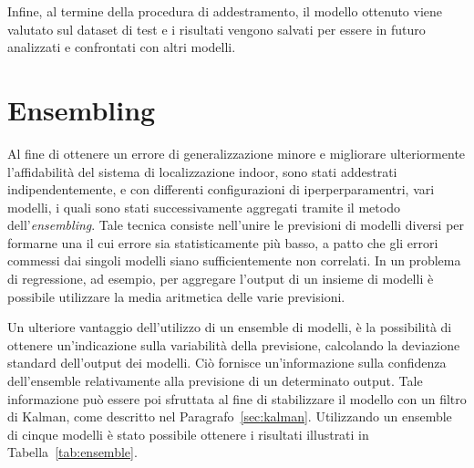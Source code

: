 Infine, al termine della procedura di addestramento, il modello ottenuto viene
valutato sul dataset di test e i risultati vengono salvati per essere in futuro
analizzati e confrontati con altri modelli.
\section{Ensembling}\label{sec:ensemble}
Al fine di ottenere un errore di generalizzazione minore e migliorare
ulteriormente l'affidabilità del sistema di localizzazione indoor, sono stati
addestrati indipendentemente, e con differenti configurazioni di
iperperparamentri, vari modelli, i quali sono stati successivamente aggregati
tramite il metodo dell'\emph{ensembling}. Tale tecnica consiste nell'unire le
previsioni di modelli diversi per formarne una il cui errore sia
statisticamente più basso, a patto che gli errori commessi dai singoli modelli
siano sufficientemente non correlati\cite{goodfellow}. In un problema di
regressione, ad esempio, per aggregare l'output di un insieme di modelli è
possibile utilizzare la media aritmetica delle varie previsioni.

Un ulteriore vantaggio dell'utilizzo di un ensemble di modelli, è la
possibilità di ottenere un'indicazione sulla variabilità della previsione,
calcolando la deviazione standard dell'output dei modelli. Ciò fornisce
un'informazione sulla confidenza dell'ensemble relativamente alla previsione di
un determinato output. Tale informazione può essere poi sfruttata al fine di
stabilizzare il modello con un filtro di Kalman, come descritto nel
Paragrafo~\ref{sec:kalman}. Utilizzando un ensemble di cinque modelli è stato
possibile ottenere i risultati illustrati in Tabella~\ref{tab:ensemble}.



